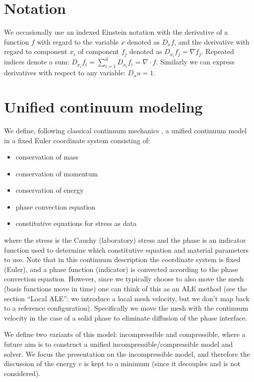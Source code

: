 
\section{Notation}

We occasionally use an indexed Einstein notation with the derivative of a
function $f$ with regard to the variable $x$ denoted as $D_x f$, and
the derivative with regard to component $x_i$ of component $f_j$
denoted as $D_{x_i} f_j = \nabla f_j$. Repeated indices denote a sum:
$D_{x_i} f_i = \sum_{i=1}^d D_{x_i} f_i = \nabla \cdot f$. Similarly
we can express derivatives with respect to any variable: $D_u u = 1$.
\section{Unified continuum modeling}


We define, following classical continuum mechanics \citep{Gurtin1981}, a
unified continuum model in a fixed Euler coordinate system consisting
of:
\begin{itemize}
\item
conservation of mass
\item
conservation of momentum
\item
conservation of energy
\item
phase convection equation
\item
constitutive equations for stress as data
\end{itemize}
where the stress is the Cauchy (laboratory) stress and
the phase is an indicator function used to determine
which constitutive equation and material parameters to
use. Note that in this continuum description the
coordinate system is fixed (Euler), and a phase
function (indicator) is convected according to the
phase convection equation. However, since we typically
choose to also move the mesh (basis functions move in
time) one can think of this as an ALE method (see the
section ``Local ALE'': we introduce a local mesh
velocity, but we don't map back to a reference
configuration). Specifically we move the mesh with the
continuum velocity in the case of a solid phase to
eliminate diffusion of the phase interface.

We define two variants of this model: incompressible and compressible,
where a future aim is to construct a unified
incompressible/compressible model and solver. We focus the
presentation on the incompressible model, and therefore the discussion
of the energy $e$ is kept to a minimum (since it decouples and is not
considered).

